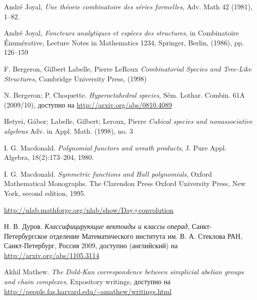 \begin{thebibliography}{9}

 André Joyal, \emph{Une théorie combinatoire des séries
formelles}, Adv. Math 42 (1981), 1–82.

 André Joyal, \emph{Foncteurs analytiques et espèces des
structures}, in Combinatoire Énumérative, Lecture Notes in Mathematics 1234, Springer,
Berlin, (1986), pp. 126–159

 F. Bergeron, Gilbert Labelle, Pierre LeRoux
\emph{Combinatorial Species and Tree-Like Structures}, Cambridge University Press, (1998)

 N. Bergeron; P. Choquette.
\emph{Hyperoctahedral species}, Sém. Lothar. Combin. 61A (2009/10), доступно на
\url{http://arxiv.org/abs/0810.4089}

 Hetyei, Gábor; Labelle, Gilbert;
Leroux, Pierre \emph{Cubical species and nonassociative algebras} Adv. in Appl.
Math. (1998), no. 3

 I. G. Macdonald. \emph{Polynomial functors and wreath
products}, J. Pure Appl. Algebra, 18(2):173–204, 1980.

 I. G. Macdonald. \emph{Symmetric functions and Hall polynomials},
Oxford Mathematical Monographs.
The Clarendon Press Oxford University Press, New York, second edition, 1995.

 \url{http://nlab.mathforge.org/nlab/show/Day+convolution}

 Н. В. Дуров. \emph{Классифицирующие вектоиды и классы операд},
Санкт-Петербургское отделение Математического института им. В. А. Стеклова РАН,
Санкт-Петербург, Россия 2009, доступно (английский) на
\url{http://arxiv.org/abs/1105.3114}

 Akhil Mathew. \emph{The Dold-Kan correspondence between
simplicial abelian groups and chain complexes}, Expository writings, доступно на 
\url{http://people.fas.harvard.edu/~amathew/writings.html}

\end{thebibliography}
